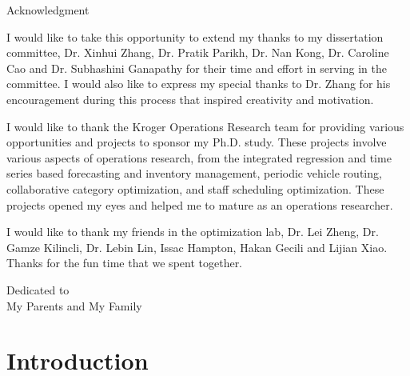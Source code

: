 \documentclass[12pt,english]{report}
\begin{document}
\begin{doublespace}
	\tableofcontents
	\listoffigures
	\listoftables
\end{doublespace}
%
\newpage
\thispagestyle{plain}
\setlength{\parindent}{0em}
\begin{center}
	{\huge Acknowledgment}
\end{center}

\setlength{\parindent}{2em}

I would like to take this opportunity to extend my thanks to my dissertation
committee,  Dr. Xinhui Zhang, Dr. Pratik Parikh, Dr. Nan Kong, Dr. Caroline Cao
and Dr. Subhashini Ganapathy for their time and effort in serving in the
committee.  I would also like to express my special thanks to Dr. Zhang for his
encouragement during this process that inspired creativity and motivation.

I would like to thank the Kroger Operations Research team for providing various
opportunities and projects to sponsor my Ph.D. study.  These projects involve
various aspects of operations research, from the integrated regression and time
series based forecasting and inventory management, periodic vehicle routing,
collaborative category optimization, and staff scheduling optimization.  These
projects opened my eyes and helped me to mature as an operations researcher.

I would like to thank my friends in the optimization lab,  Dr. Lei Zheng, Dr.
Gamze Kilincli, Dr. Lebin Lin, Issac Hampton, Hakan Gecili and Lijian Xiao.
Thanks for the fun time that we spent together.

%
\newpage
\thispagestyle{plain}
\vspace*{3in}
\begin{center}
	Dedicated to\\
	My Parents and My Family
\end{center}
%
%
%

\newpage
\setcounter{page}{1}
\setlength{\parindent}{2em}
\chapter{Introduction}
\end{document}
